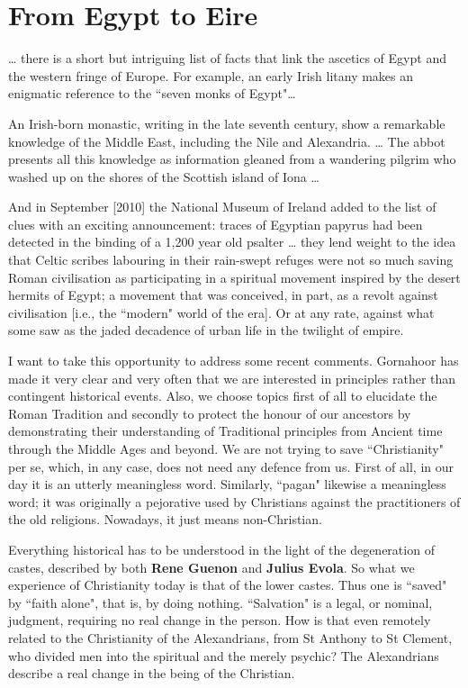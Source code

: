 \section{From Egypt to Eire}

\begin{quotex}
… there is a short but intriguing list of facts that link the ascetics of Egypt and the western fringe of Europe. For example, an early Irish litany makes an enigmatic reference to the ``seven monks of Egypt"…

An Irish-born monastic, writing in the late seventh century, show a remarkable knowledge of the Middle East, including the Nile and Alexandria. … The abbot presents all this knowledge as information gleaned from a wandering pilgrim who washed up on the shores of the Scottish island of Iona …

And in September [2010] the National Museum of Ireland added to the list of clues with an exciting announcement: traces of Egyptian papyrus had been detected in the binding of a 1,200 year old psalter … they lend weight to the idea that Celtic scribes labouring in their rain-swept refuges were not so much saving Roman civilisation as participating in a spiritual movement inspired by the desert hermits of Egypt; a movement that was conceived, in part, as a revolt against civilisation [i.e., the ``modern" world of the era]. Or at any rate, against what some saw as the jaded decadence of urban life in the twilight of empire.


\end{quotex}
I want to take this opportunity to address some recent comments. Gornahoor has made it very clear and very often that we are interested in principles rather than contingent historical events. Also, we choose topics first of all to elucidate the Roman Tradition and secondly to protect the honour of our ancestors by demonstrating their understanding of Traditional principles from Ancient time through the Middle Ages and beyond. We are not trying to save ``Christianity" per se, which, in any case, does not need any defence from us. First of all, in our day it is an utterly meaningless word. Similarly, ``pagan" likewise a meaningless word; it was originally a pejorative used by Christians against the practitioners of the old religions. Nowadays, it just means non-Christian.

Everything historical has to be understood in the light of the degeneration of castes, described by both \textbf{Rene Guenon} and \textbf{Julius Evola}. So what we experience of Christianity today is that of the lower castes. Thus one is ``saved" by ``faith alone", that is, by doing nothing. ``Salvation" is a legal, or nominal, judgment, requiring no real change in the person. How is that even remotely related to the Christianity of the Alexandrians, from St Anthony to St Clement, who divided men into the spiritual and the merely psychic? The Alexandrians describe a real change in the being of the Christian.

